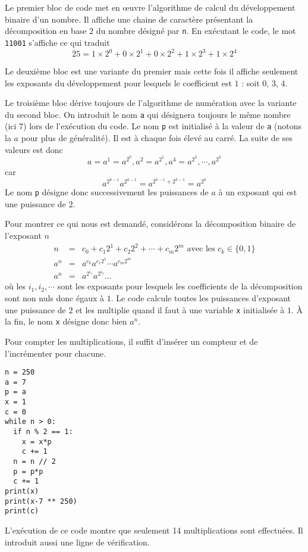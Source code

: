 Le premier bloc de code met en \oe{}uvre l'algorithme de calcul du développement binaire d'un nombre. Il affiche une chaine de caractère présentant la décomposition en base $2$ du nombre désigné par \verb|n|.\newline
En exécutant le code, le mot \verb|11001| s'affiche ce qui traduit
\begin{displaymath}
 25 = 1\times 2^0 + 0\times 2^1 + 0\times 2^2 + 1\times 2^3 + 1\times 2^4  
\end{displaymath}

Le deuxième bloc est une variante du premier mais cette fois il affiche seulement les exposants du développement pour lesquels le coefficient est $1$ : soit $0$, $3$, $4$.

Le troisième bloc dérive toujours de l'algorithme de numération avec la variante du second bloc. On introduit le nom \verb|a| qui désignera toujours le même nombre (ici $7$) lors de l'exécution du code. 
Le nom \verb|p| est initialisé à la valeur de \verb|a| (notons la $a$ pour plus de généralité). Il est à chaque fois élevé au carré. La suite de ses valeurs est donc
\begin{displaymath}
 a=a^{1}=a^{2^{0}}, a^2=a^{2^{1}}, a^4=a^{2^{2}}, \cdots , a^{2^{k}}
\end{displaymath}
car 
\begin{displaymath}
 a^{2^{k-1}}a^{2^{k-1}}= a^{2^{k-1} + 2^{k-1}}=a^{2^{k}}
\end{displaymath}
Le nom \verb|p| désigne donc successivement les puissances de $a$ à un exposant qui est une puissance de $2$.

Pour montrer ce qui nous est demandé, considérons la décomposition binaire de l'exposant $n$
\begin{eqnarray*}
 n &=& c_0 + c_1 2^1 + c_2 2^2+ \cdots +c_m 2^m \text{ avec les } c_k\in\{0,1\}\\
 a^n &=& a^{c_0}a^{c_1 2^1} \cdots a^{c_m 2^m} \\
 a^n &=& a^{2^{i_1}} a^{2^{i_2}} ...
\end{eqnarray*}
où les $i_1, i_2, \cdots$ sont les exposants pour lesquels les coefficients de la décomposition sont non nuls donc égaux à $1$.\newline
Le code calcule toutes les puissances d'exposant une puissance de $2$ et les multiplie quand il faut à une variable \verb|x| initialisée à $1$. \`A la fin, le nom \verb|x| désigne donc bien $a^n$.

Pour compter les multiplications, il suffit d'insérer un compteur et de l'incrémenter pour chacune.
\begin{verbatim}
n = 250
a = 7
p = a
x = 1
c = 0
while n > 0:
  if n % 2 == 1:
    x = x*p
    c += 1
  n = n // 2
  p = p*p
  c += 1
print(x)
print(x-7 ** 250)
print(c)
\end{verbatim}
L'exécution de ce code montre que seulement 14 multiplications sont effectuées. Il introduit aussi une ligne de vérification.

